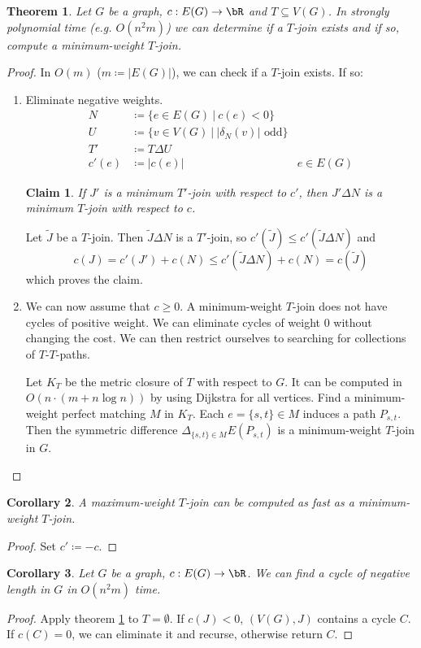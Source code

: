 \documentclass[11pt, a4paper]{article}
\newcommand{\abs}[1]{\left\lvert#1\right\rvert}
\newcommand{\set}[1]{\{#1\}}
\newtheorem{theorem}{Theorem}[section]
\newtheorem{cor}[theorem]{Corollary}
\newtheorem*{claim}{Claim}
\theoremstyle{remark}
\theoremstyle{definition}
\begin{document}
\begin{theorem}\label{thm:t-join-alg}
Let $G$ be a graph, $c: E(G)\to\bR$ and $T\subseteq V(G)$. In strongly
polynomial time (e.g. $O(n^2m)$) we can determine if a $T$-join exists and
if so, compute a minimum-weight $T$-join.
\end{theorem}
\begin{proof}
In $O(m)$ ($m\coloneqq\abs{E(G)}$), we can check if a $T$-join exists. If
so:
\begin{enumerate}
	\item Eliminate negative weights.
	\begin{align*}
		N&\coloneqq\set{e\in E(G)\ |\ c(e)<0} \\
		U&\coloneqq\set{v\in V(G)\ |\ \abs{\delta_N(v)}\text{ odd}} \\
		T'&\coloneqq T\Delta U \\
		c'(e)&\coloneqq \abs{c(e)} &e\in E(G)
	\end{align*}
	\begin{claim}
	If $J'$ is a minimum $T'$-join with respect to $c'$, then $J'\Delta N$
	is a minimum $T$-join with respect to $c$.
	\end{claim}
	Let $\tilde J$ be a $T$-join. Then $\tilde J\Delta N$ is a $T'$-join, so
	$c'(\tilde J)\leq c'(\tilde J\Delta N)$ and
	\[c(J)=c'(J')+c(N)\leq c'(\tilde J\Delta N)+c(N)=c(\tilde J)\]
	which proves the claim.
	
	\item We can now assume that $c\geq0$. A minimum-weight $T$-join does
	not have cycles of positive weight. We can eliminate cycles of weight
	0 without changing the cost. We can then restrict ourselves to searching
	for collections of $T$-$T$-paths.
	
	Let $K_T$ be the metric closure of $T$ with respect to $G$. It can
	be computed in $O(n\cdot(m+n\log n))$ by using Dijkstra for all vertices.
	Find a minimum-weight perfect matching $M$ in $K_T$. Each $e=\set{s,t}
	\in M$ induces a path $P_{s,t}$. Then the symmetric difference
	$\Delta_{\set{s,t}\in M}E(P_{s,t})$ is a minimum-weight $T$-join in $G$.
\end{enumerate}
\end{proof}

\begin{cor}
A maximum-weight $T$-join can be computed as fast as a minimum-weight
$T$-join.
\end{cor}
\begin{proof}
Set $c'\coloneqq -c$.
\end{proof}

\begin{cor}
Let $G$ be a graph, $c: E(G)\to\bR$. We can find a cycle of negative length
in $G$ in $O(n^2m)$ time.
\end{cor}
\begin{proof}
Apply theorem \ref{thm:t-join-alg} to $T=\emptyset$. If $c(J)<0$,
$(V(G),J)$ contains a cycle $C$. If $c(C)=0$, we can eliminate it and
recurse, otherwise return $C$. 
\end{proof}
\end{document}
